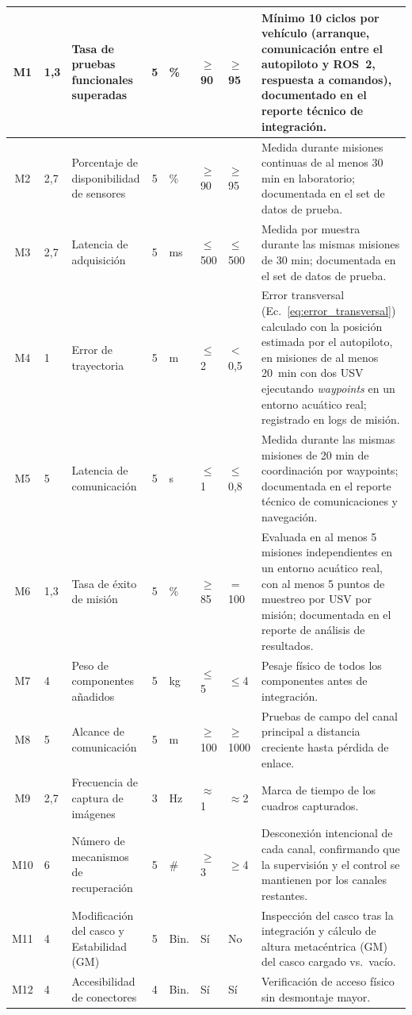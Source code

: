 \begin{longtable}{|c|p{1.3cm}|p{3.1cm}|c|p{1cm}|p{1.6cm}|p{1.7cm}|p{3.6cm}|}
M1 & 1,3 & Tasa de pruebas funcionales superadas & 5 & \% & $\geq$90 & $\geq$95 & Mínimo 10 ciclos por vehículo (arranque, comunicación entre el autopiloto y ROS~2, respuesta a comandos), documentado en el reporte técnico de integración. \\ \hline
M2 & 2,7 & Porcentaje de disponibilidad de sensores & 5 & \% & $\geq$90 & $\geq$95 & Medida durante misiones continuas de al menos 30 min en laboratorio; documentada en el set de datos de prueba. \\ \hline
M3 & 2,7 & Latencia de adquisición & 5 & ms & $\leq$500 & $\leq$500 & Medida por muestra durante las mismas misiones de 30 min; documentada en el set de datos de prueba. \\ \hline
M4 & 1 & Error de trayectoria & 5 & m & $\leq$2 & $<$0,5 & Error transversal (Ec.~\ref{eq:error_transversal}) calculado con la posición estimada por el autopiloto, en misiones de al menos 20~min con dos USV ejecutando \textit{waypoints} en un entorno acuático real; registrado en logs de misión. \\ \hline
M5 & 5 & Latencia de comunicación & 5 & s & $\leq$1 & $\leq$0,8 & Medida durante las mismas misiones de 20 min de coordinación por waypoints; documentada en el reporte técnico de comunicaciones y navegación. \\ \hline
M6 & 1,3 & Tasa de éxito de misión & 5 & \% & $\geq$85 & $=$100 & Evaluada en al menos 5 misiones independientes en un entorno acuático real, con al menos 5 puntos de muestreo por USV por misión; documentada en el reporte de análisis de resultados. \\ \hline
M7 & 4 & Peso de componentes añadidos & 5 & kg & $\leq$5 & $\leq$4 & Pesaje físico de todos los componentes antes de integración. \\ \hline
M8 & 5 & Alcance de comunicación & 5 & m & $\geq$100 & $\geq$1000 & Pruebas de campo del canal principal a distancia creciente hasta pérdida de enlace. \\ \hline
M9 & 2,7 & Frecuencia de captura de imágenes & 3 & Hz & $\approx$1 & $\approx$2 & Marca de tiempo de los cuadros capturados. \\ \hline
M10 & 6 & Número de mecanismos de recuperación & 5 & \# & $\geq$3 & $\geq$4 & Desconexión intencional de cada canal, confirmando que la supervisión y el control se mantienen por los canales restantes. \\ \hline
M11 & 4 & Modificación del casco y Estabilidad (GM) & 5 & Bin. & Sí & No & Inspección del casco tras la integración y cálculo de altura metacéntrica (GM) del casco cargado vs.\ vacío.\\ \hline
M12 & 4 & Accesibilidad de conectores & 4 & Bin. & Sí & Sí & Verificación de acceso físico sin desmontaje mayor. \\ \hline

\end{longtable}
\setlength{\tabcolsep}{6pt}
\normalsize

